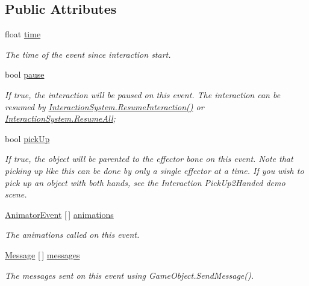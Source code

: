 \subsection*{Public Attributes}
\begin{DoxyCompactItemize}
\item 
float \mbox{\hyperlink{class_root_motion_1_1_final_i_k_1_1_interaction_object_1_1_interaction_event_a6925097f5313118f479be761908336ad}{time}}
\begin{DoxyCompactList}\small\item\em The time of the event since interaction start. \end{DoxyCompactList}\item 
bool \mbox{\hyperlink{class_root_motion_1_1_final_i_k_1_1_interaction_object_1_1_interaction_event_a01eadbd600f398a8178832b12f033a30}{pause}}
\begin{DoxyCompactList}\small\item\em If true, the interaction will be paused on this event. The interaction can be resumed by \mbox{\hyperlink{class_root_motion_1_1_final_i_k_1_1_interaction_system_ac201f874a5a9e7f12e648329d5f8e31a}{Interaction\+System.\+Resume\+Interaction()}} or \mbox{\hyperlink{class_root_motion_1_1_final_i_k_1_1_interaction_system_a19f513364b351e2248196e99abb14071}{Interaction\+System.\+Resume\+All}}; \end{DoxyCompactList}\item 
bool \mbox{\hyperlink{class_root_motion_1_1_final_i_k_1_1_interaction_object_1_1_interaction_event_a259370c35eb976f191f45496f4638621}{pick\+Up}}
\begin{DoxyCompactList}\small\item\em If true, the object will be parented to the effector bone on this event. Note that picking up like this can be done by only a single effector at a time. If you wish to pick up an object with both hands, see the Interaction Pick\+Up2\+Handed demo scene. \end{DoxyCompactList}\item 
\mbox{\hyperlink{class_root_motion_1_1_final_i_k_1_1_interaction_object_1_1_animator_event}{Animator\+Event}} \mbox{[}$\,$\mbox{]} \mbox{\hyperlink{class_root_motion_1_1_final_i_k_1_1_interaction_object_1_1_interaction_event_a811c74f16b46d3af5e9d7c54bf0bd211}{animations}}
\begin{DoxyCompactList}\small\item\em The animations called on this event. \end{DoxyCompactList}\item 
\mbox{\hyperlink{class_root_motion_1_1_final_i_k_1_1_interaction_object_1_1_message}{Message}} \mbox{[}$\,$\mbox{]} \mbox{\hyperlink{class_root_motion_1_1_final_i_k_1_1_interaction_object_1_1_interaction_event_a60681f8750eeb20d309e21aff84b7711}{messages}}
\begin{DoxyCompactList}\small\item\em The messages sent on this event using Game\+Object.\+Send\+Message(). \end{DoxyCompactList}\end{DoxyCompactItemize}



